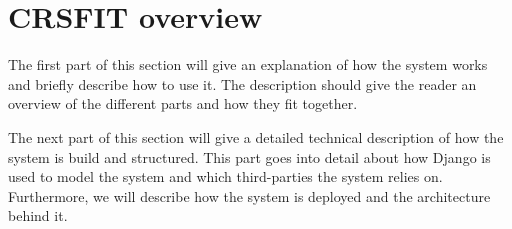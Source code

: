 \section{CRSFIT overview}
The first part of this section will give an explanation of how the system works and briefly describe how to use it. The description should give the reader an overview of the different parts and how they fit together.

The next part of this section will give a detailed technical description of how the system is build and structured. This part goes into detail about how Django is used to model the system and which third-parties the system relies on. Furthermore, we will describe how the system is deployed and the architecture behind it.

